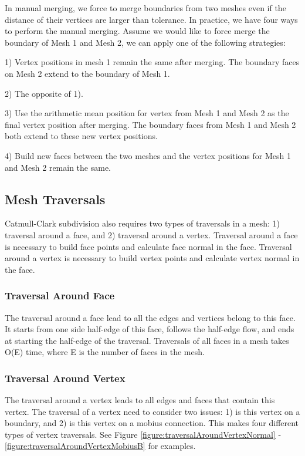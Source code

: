 \documentclass[12pt]{article}
\begin{document}
In manual merging, we force to merge boundaries from two meshes even if the distance of their vertices are larger than tolerance. In practice, we have four ways to perform the manual merging. Assume we would like to force merge the boundary of Mesh 1 and Mesh 2, we can apply one of the following strategies:

1) Vertex positions in mesh 1 remain the same after merging. The boundary faces on Mesh 2 extend to the boundary of Mesh 1.

2) The opposite of 1).

3) Use the arithmetic mean position for vertex from Mesh 1 and Mesh 2 as the final vertex position after merging. The boundary faces from Mesh 1 and Mesh 2 both extend to these new vertex positions.

4) Build new faces between the two meshes and the vertex positions for Mesh 1 and Mesh 2 remain the same.

\subsection{Mesh Traversals} 
Catmull-Clark subdivision also requires two types of traversals in a mesh: 1) traversal around a face, and 2) traversal around a vertex. Traversal around a face is necessary to build face points and calculate face normal in the face. Traversal around a vertex is necessary to build vertex points and calculate vertex normal in the face.

\subsubsection{Traversal Around Face}
The traversal around a face lead to all the edges and vertices belong to this face. It starts from one side half-edge of this face, follows the half-edge flow, and ends at starting the half-edge of the traversal.
Traversals of all faces in a mesh takes O(E) time, where E is the number of faces in the mesh.

\subsubsection{Traversal Around Vertex}
The traversal around a vertex leads to all edges and faces that contain this vertex. The traversal of a vertex need to consider two issues: 1) is this vertex on a boundary, and  2) is this vertex on a mobius connection. This makes four different types of vertex traversals. See Figure \ref{figure:traversalAroundVertexNormal} - \ref{figure:traversalAroundVertexMobiusB} for examples.
\end{document}

